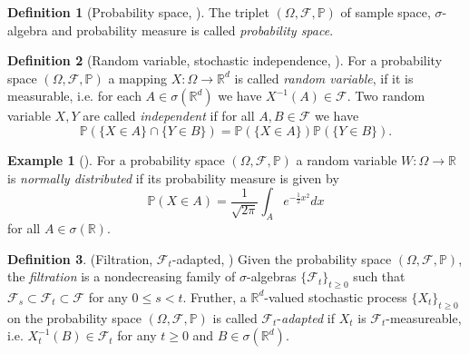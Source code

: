 \documentclass[12pt]{article}
\theoremstyle{definition}
\newtheorem{example}[example]{Example}
\newtheorem{definition}[definition]{Definition}
\numberwithin{equation}{section}
\newcommand{\R}{\mathbb{R}}
\newcommand{\BP}{\mathbb{P}}
\newcommand{\CF}{\mathcal{F}}
\begin{document}
 \begin{definition}[Probability space, ]
   The triplet $(\Omega, \CF, \BP)$ of sample space, $\sigma$-algebra and probability measure is called \emph{probability space}.
 \end{definition}
 \begin{definition}[Random variable, stochastic independence, ]
  For a probability space $(\Omega, \CF, \BP)$ a mapping $X : \Omega \rightarrow \R^d$ is called \emph{random variable}, if it is measurable, i.e. for each $A \in \sigma(\R^d)$ we have $X^{-1}(A) \in \CF$.
  Two random variable $X, Y$ are called \emph{independent} if for all $A,B \in \CF$ we have
  \begin{equation*}
    \BP(\{X \in A\} \cap \{Y \in B\}) = \BP(\{X \in A\})\BP(\{Y \in B\}).
  \end{equation*}
 \end{definition}
 \begin{example}[]
  For a probability space $(\Omega, \CF, \BP)$ a random variable $W : \Omega \rightarrow \R$ is \emph{normally distributed} if its probability measure is given by
  \begin{equation*}
    \BP(X \in A) = \frac{1}{\sqrt{2 \pi}} \int_A e^{-\frac{1}{2}x^2}dx
  \end{equation*}
  for all $A \in \sigma(\R)$.
 \end{example}
 \begin{definition}(Filtration, $\CF_t$-adapted, )
   Given the probability space $(\Omega, \CF, \BP)$, the \emph{filtration} is a nondecreasing family of $\sigma$-algebras $\{\CF_t\}_{t\geq 0}$ such that $\CF_s \subset \CF_t \subset \CF$ for any $0 \leq s < t$. Fruther, a $\R^d$-valued stochastic process $\{X_t\}_{t \geq 0}$ on the probability space  $(\Omega, \CF, \BP)$ is called $\CF_t$-\emph{adapted} if $X_t$ is $\CF_t$-measureable, i.e. $X_t^{-1}(B) \in \CF_t$ for any $t \geq 0$ and $B \in \sigma(\R^d)$.
 \end{definition}
 
\end{document}

